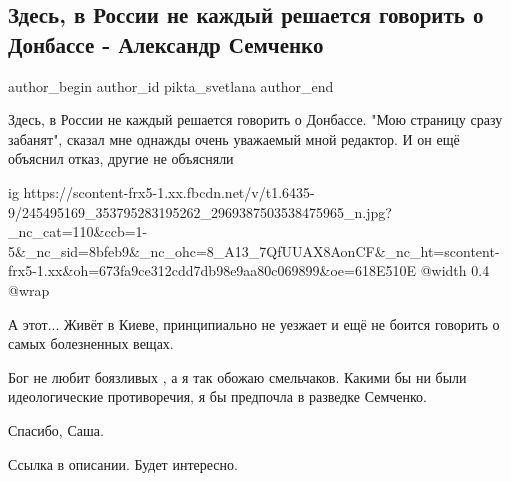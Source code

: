  
 
 
 
 
 
\subsection{Здесь, в России не каждый решается говорить о Донбассе - Александр Семченко}
\label{sec:13_10_2021.fb.pikta_svetlana.3.donbass_semchenko}
 
\ifcmt
 author_begin
   author_id pikta_svetlana
 author_end
\fi

Здесь, в России не каждый решается говорить о Донбассе. "Мою страницу сразу
забанят", сказал мне однажды очень уважаемый мной редактор. И он ещё объяснил
отказ, другие не объясняли

\ifcmt
  ig https://scontent-frx5-1.xx.fbcdn.net/v/t1.6435-9/245495169_353795283195262_2969387503538475965_n.jpg?_nc_cat=110&ccb=1-5&_nc_sid=8bfeb9&_nc_ohc=8_A13_7QfUUAX8AonCF&_nc_ht=scontent-frx5-1.xx&oh=673fa9ce312cdd7db98e9aa80c069899&oe=618E510E
  @width 0.4
  @wrap 
\fi

А этот... Живёт в Киеве, принципиально не уезжает и ещё не боится говорить о
самых болезненных вещах. 

Бог не любит боязливых , а я так обожаю смельчаков. Какими бы ни были
идеологические противоречия, я бы предпочла в разведке Семченко. 

Спасибо, Саша. 

Ссылка в описании. Будет интересно.

